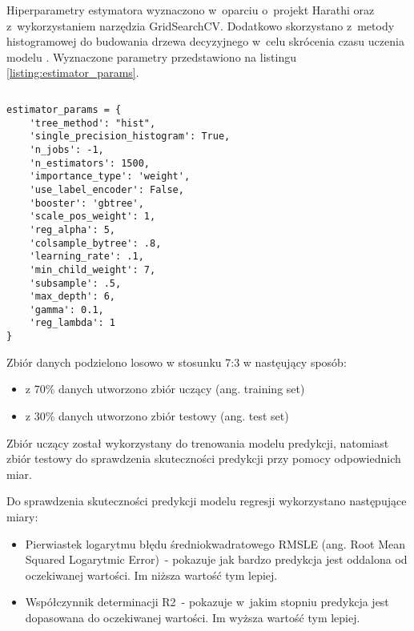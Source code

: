 Hiperparametry estymatora wyznaczono w~oparciu o~projekt Harathi \cite{harathi-2018} oraz z~wykorzystaniem narzędzia GridSearchCV.
Dodatkowo skorzystano z~metody histogramowej do budowania drzewa decyzyjnego w~celu skrócenia czasu uczenia modelu \cite{golarnyk-2021}.
Wyznaczone parametry przedstawiono na listingu \ref{listing:estimator_params}.


\noindent\begin{minipage}{\textwidth}
             \begin{lstlisting}[caption={Parametry estmatora}, label={listing:estimator_params}]
             \end{lstlisting}
             \hspace{.075\textwidth}\begin{minipage}{.85\textwidth}
                                        \begin{verbatim}
estimator_params = {
    'tree_method': "hist",
    'single_precision_histogram': True,
    'n_jobs': -1,
    'n_estimators': 1500,
    'importance_type': 'weight',
    'use_label_encoder': False,
    'booster': 'gbtree',
    'scale_pos_weight': 1,
    'reg_alpha': 5,
    'colsample_bytree': .8,
    'learning_rate': .1,
    'min_child_weight': 7,
    'subsample': .5,
    'max_depth': 6,
    'gamma': 0.1,
    'reg_lambda': 1
}
                                        \end{verbatim}
             \end{minipage}

             \raggedright\source{\ownwork}
             \vspace{0.75cm}
\end{minipage}

Zbiór danych podzielono losowo w stosunku 7:3 w nastęujący sposób:
\begin{itemize}
    \item z 70\% danych utworzono zbiór uczący (ang. training set)
    \item z 30\% danych utworzono zbiór testowy (ang. test set)
\end{itemize}

Zbiór uczący został wykorzystany do trenowania modelu predykcji, natomiast zbiór testowy do sprawdzenia skuteczności predykcji przy pomocy odpowiednich miar.

Do sprawdzenia skuteczności predykcji modelu regresji wykorzystano następujące miary:
\begin{itemize}
    \item Pierwiastek logarytmu błędu średniokwadratowego RMSLE (ang. Root Mean Squared Logarytmic Error)~- pokazuje jak bardzo predykcja jest oddalona od oczekiwanej wartości. Im niższa wartość tym lepiej.
    \item Współczynnik determinacji R2~- pokazuje w~jakim stopniu predykcja jest dopasowana do oczekiwanej wartości. Im wyższa wartość tym lepiej.
\end{itemize}

